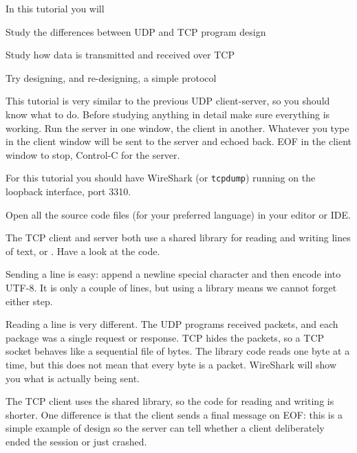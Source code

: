 









In this tutorial you will

\DOT Study the differences between UDP and TCP program design

\DOT Study how data is transmitted and received over TCP

\DOT Try designing, and re-designing, a simple protocol


This tutorial is very similar to the previous UDP client-server, so you should
know what to do. Before studying anything in detail make sure everything is
working. Run the server in one window, the client in another. Whatever
you type in the client window will be sent to the server and echoed back. EOF
in the client window to stop, Control-C for the server.

For this tutorial you should have WireShark (or \texttt{tcpdump}) running
on the loopback interface, port 3310.



Open all the source code files (for your preferred language) in your editor
or IDE.

The TCP client and server both use a shared library for reading and writing
lines of text,  or . Have a look at the
code.

Sending a line is easy: append a newline special character and then encode
into UTF-8. It is only a couple of lines, but using a library means we cannot
forget either step.

Reading a line is very different. The UDP programs received packets, and each
package was a single request or response. TCP hides the packets, so a TCP
socket behaves like a sequential file of bytes. The library code reads one
byte at a time, but this does not mean that every byte is a packet. WireShark
will show you what is actually being sent.

The TCP client uses the shared library, so the code for reading and writing
is shorter. One difference is that the client sends a final message on EOF:
this is a simple example of  design so the server can tell
whether a client deliberately ended the session or just crashed.

